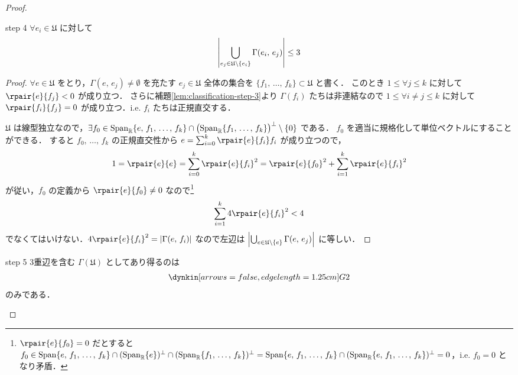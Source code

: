 \documentclass[rep_main]{subfiles}
\begin{document}
\begin{proof}
	\begin{mylem}[label=lem:classification-step-4]{step 4}
		$\forall e_i \in \mathfrak{U}$ に対して
		\begin{align}
			\abs{\bigcup_{e_j \in \mathfrak{U} \setminus \{e_i\}} \Gamma(e_i,\, e_j)} \le 3
		\end{align}
	\end{mylem}
	
	\begin{proof}
		$\forall e \in \mathfrak{U}$ をとり，$\Gamma(e,\, e_j) \neq \emptyset$ を充たす $e_j \in \mathfrak{U}$ 全体の集合を $\{f_1,\, \dots,\, f_k\} \subset \mathfrak{U}$ と書く．
		このとき $1 \le \forall j \le k$ に対して $\rpair{e}{f_j} < 0$ が成り立つ．
		さらに補題\ref{lem:classification-step-3}より $\Gamma(f_i)$ たちは非連結なので $1 \le \forall i \neq j \le k$ に対して $\rpair{f_i}{f_j} = 0$ が成り立つ．i.e. $f_i$ たちは正規直交する．

		$\mathfrak{U}$ は線型独立なので，$\exists f_0 \in \operatorname{Span}_{\mathbb{R}} \{e,\, f_1,\, \dots,\, f_k\} \cap \bigl(\operatorname{Span}_{\mathbb{R}} \{f_1,\, \dots,\, f_k\}\bigr)^\perp \setminus \{0\}$ である．
		$f_0$ を適当に規格化して単位ベクトルにすることができる． 
		すると $f_0,\, \dots,\, f_k$ の正規直交性から $e = \sum_{i=0}^k \rpair{e}{f_i} f_i$ が成り立つので，
		\begin{align}
			1 = \rpair{e}{e} = \sum_{i=0}^k \rpair{e}{f_i}^2 = \rpair{e}{f_0}^2 + \sum_{i=1}^k \rpair{e}{f_i}^2
		\end{align}
		が従い，$f_0$ の定義から $\rpair{e}{f_0} \neq 0$ なので\footnote{$\rpair{e}{f_0} = 0$ だとすると $f_0 \in \operatorname{Span}\{e,\, f_1,\, \dots,\, f_k\} \cap (\operatorname{Span}_{\mathbb{R}}\{e\})^\perp \cap (\operatorname{Span}_{\mathbb{R}}\{f_1,\, \dots,\, f_k\})^\perp = \operatorname{Span}\{e,\, f_1,\, \dots,\, f_k\} \cap (\operatorname{Span}_{\mathbb{R}}\{e,\, f_1,\, \dots,\, f_k\})^\perp = 0$，i.e. $f_0 = 0$ となり矛盾．}
		\begin{align}
			\sum_{i=1}^k 4\rpair{e}{f_i}^2 < 4
		\end{align}
		でなくてはいけない．$4\rpair{e}{f_i}^2 = \abs{\Gamma(e,\, f_i)}$ なので左辺は
		$\abs{\bigcup_{e \in \mathfrak{U} \setminus \{e\}} \Gamma(e,\, e_j)}$ に等しい．
	\end{proof}

	\begin{mylem}[label=lem:classification-step-5]{step 5}
		3重辺を含む $\Gamma(\mathfrak{U})$ としてあり得るのは
		\begin{align}
			\dynkin[arrows=false,edge length=1.25cm]G2
		\end{align}
		のみである．
	\end{mylem}
	

\end{proof}
\end{document}
